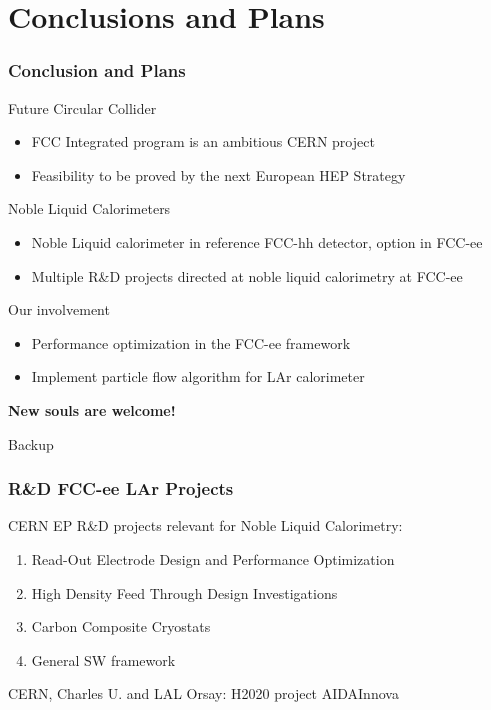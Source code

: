 \documentclass[aspectratio=169]{beamer}
\newcommand{\backupbegin}{%
   \newcounter{finalframe}
   \setcounter{finalframe}{\value{framenumber}}
}
\newcommand{\bluetext}[1]{%
  \textcolor{myBlue}{#1}
}
\newcommand{\redtext}[1]{%
  \textcolor{myRed}{#1}
}
\begin{document}
%
%
\section{Conclusions and Plans}

\begin{frame}
  \frametitle{Conclusion and Plans}

  \bluetext{Future Circular Collider}
  \begin{itemize}
    \item FCC Integrated program is an ambitious CERN project
    \item Feasibility to be proved by the next European HEP Strategy
  \end{itemize}

  \bluetext{Noble Liquid Calorimeters}
  \begin{itemize}
    \item Noble Liquid calorimeter in reference FCC-hh detector, option in
          FCC-ee
    \item Multiple R\&D projects directed at noble liquid  calorimetry at FCC-ee
  \end{itemize}

  \bluetext{Our involvement}
  \begin{itemize}
    \item Performance optimization in the FCC-ee framework
    \item Implement particle flow algorithm for LAr calorimeter
  \end{itemize}

  \begin{center}
    \bluetext{\bf New souls are welcome!}
  \end{center}
\end{frame}

%
%
\appendix
\backupbegin{}

\begin{frame}[c]
  \begin{center}
    \redtext{\Huge Backup}
  \end{center}
\end{frame}


\begin{frame}
  \frametitle{R\&D FCC-ee LAr Projects}

  CERN EP R\&D projects relevant for Noble Liquid Calorimetry:

  \begin{enumerate}
    \item Read-Out Electrode Design and Performance Optimization
    \item High Density Feed Through Design Investigations
    \item Carbon Composite Cryostats
    \item General SW framework
  \end{enumerate}

  CERN, Charles U. and LAL Orsay: H2020 project AIDAInnova

\end{frame}
\end{document}
